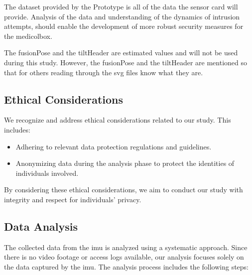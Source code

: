 \documentclass[../main.tex]{subfiles}
\begin{document}
    The dataset provided by the Prototype is all of the data the sensor card will provide.
    Analysis of the data and understanding of the dynamics of
    \gls{intrusion} attempts, should enable the development of more
    robust security measures for the \gls{medicolbox}.

    The fusionPose and the tiltHeader are estimated values and will not be used during this study. However, the fusionPose and the tiltHeader are mentioned so that for others reading through the svg files know what they are.

    \subsection{Ethical Considerations}

    We recognize and address ethical considerations related to our study. This includes:

    \begin{itemize}
        \item Adhering to relevant data protection regulations and guidelines.
        \item Anonymizing data during the analysis phase to protect the identities of individuals involved.
    \end{itemize}

    By considering these ethical considerations,
    we aim to conduct our study with integrity and respect for individuals' privacy.

    \subsection{Data Analysis}

    The collected data from the \gls{imu} is analyzed using a systematic approach.
    Since there is no video footage or access logs available,
    our analysis focuses solely on the data captured by the \gls{imu}.
    The analysis process includes the following steps:
    
\end{document}
